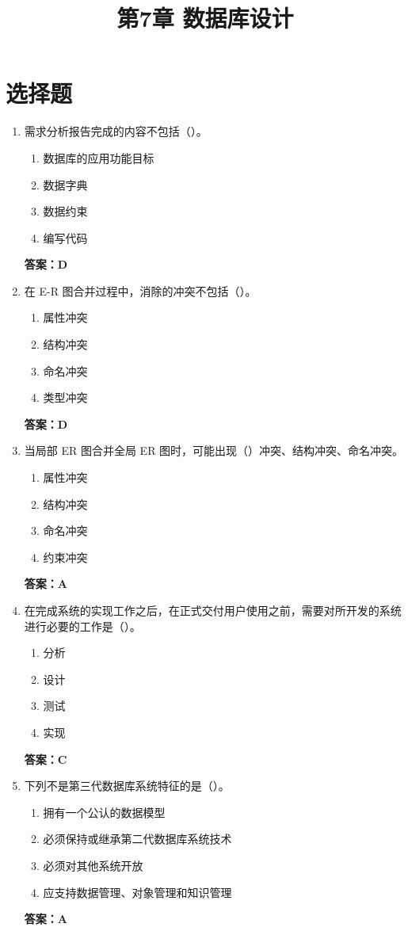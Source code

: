\documentclass[12pt, a4paper]{article}
\title{\textbf{第7章 数据库设计}}
\date{}
\begin{document}
\section{选择题}

\begin{enumerate}[label=\arabic*.]
	\item 需求分析报告完成的内容不包括（\quad）。
	      \begin{enumerate}
		      \item 数据库的应用功能目标
		      \item 数据字典
		      \item 数据约束
		      \item 编写代码
	      \end{enumerate}
	      \textbf{答案：D}

	\item 在 E-R 图合并过程中，消除的冲突不包括（\quad）。
	      \begin{enumerate}
		      \item 属性冲突
		      \item 结构冲突
		      \item 命名冲突
		      \item 类型冲突
	      \end{enumerate}
	      \textbf{答案：D}

	\item 当局部 ER 图合并全局 ER 图时，可能出现（\quad）冲突、结构冲突、命名冲突。
	      \begin{enumerate}
		      \item 属性冲突
		      \item 结构冲突
		      \item 命名冲突
		      \item 约束冲突
	      \end{enumerate}
	      \textbf{答案：A}

	\item 在完成系统的实现工作之后，在正式交付用户使用之前，需要对所开发的系统进行必要的工作是（\quad）。
	      \begin{enumerate}
		      \item 分析
		      \item 设计
		      \item 测试
		      \item 实现
	      \end{enumerate}
	      \textbf{答案：C}

	\item 下列不是第三代数据库系统特征的是（\quad）。
	      \begin{enumerate}
		      \item 拥有一个公认的数据模型
		      \item 必须保持或继承第二代数据库系统技术
		      \item 必须对其他系统开放
		      \item 应支持数据管理、对象管理和知识管理
	      \end{enumerate}
	      \textbf{答案：A}


\end{enumerate}
\end{document}
